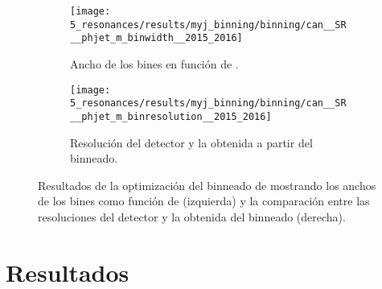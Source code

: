 \begin{figure}[ht!]
    \centering
    \begin{subfigure}[t]{0.49\linewidth}
        \centering
        \texttt{[image: 5\_resonances/results/myj\_binning/binning/can\_\_SR\_\_phjet\_m\_binwidth\_\_2015\_2016]}
        \caption{Ancho de los bines en función de \myj.}
        \label{fig:bkg_modeling:observable:results:binwidth}
    \end{subfigure}
    \hfill
    \begin{subfigure}[t]{0.49\linewidth}
        \centering
        \texttt{[image: 5\_resonances/results/myj\_binning/binning/can\_\_SR\_\_phjet\_m\_binresolution\_\_2015\_2016]}
        \caption{Resolución del detector y la obtenida a partir del binneado.}
        \label{fig:bkg_modeling:observable:results:resolution_comparison}
    \end{subfigure}
    \caption{Resultados de la optimización del binneado de \myj mostrando los anchos de los bines como función de \myj (izquierda) y la comparación entre las resoluciones del detector y la obtenida del binneado (derecha).}
    \label{fig:bkg_modeling:observable:results}
\end{figure}



























\section{Resultados}
\label{sec:results:results}

